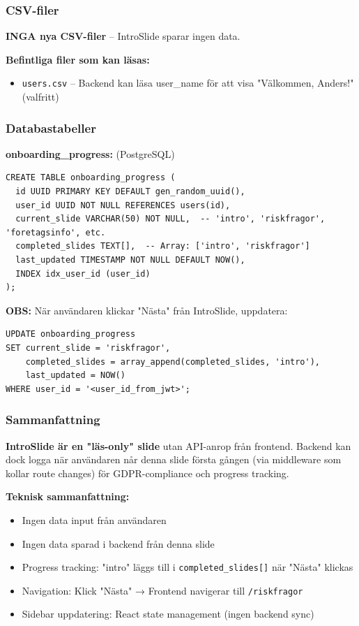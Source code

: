 \documentclass[12pt,a4paper]{article}
\begin{document}
\subsubsection{CSV-filer}
\textbf{INGA nya CSV-filer} -- IntroSlide sparar ingen data.

\textbf{Befintliga filer som kan läsas:}
\begin{itemize}[noitemsep]
  \item \texttt{users.csv} -- Backend kan läsa user\_name för att visa "Välkommen, Anders!" (valfritt)
\end{itemize}

\subsubsection{Databastabeller}
\textbf{onboarding\_progress:} (PostgreSQL)
\begin{lstlisting}
CREATE TABLE onboarding_progress (
  id UUID PRIMARY KEY DEFAULT gen_random_uuid(),
  user_id UUID NOT NULL REFERENCES users(id),
  current_slide VARCHAR(50) NOT NULL,  -- 'intro', 'riskfragor', 'foretagsinfo', etc.
  completed_slides TEXT[],  -- Array: ['intro', 'riskfragor']
  last_updated TIMESTAMP NOT NULL DEFAULT NOW(),
  INDEX idx_user_id (user_id)
);
\end{lstlisting}

\textbf{OBS:} När användaren klickar "Nästa" från IntroSlide, uppdatera:
\begin{lstlisting}
UPDATE onboarding_progress
SET current_slide = 'riskfragor',
    completed_slides = array_append(completed_slides, 'intro'),
    last_updated = NOW()
WHERE user_id = '<user_id_from_jwt>';
\end{lstlisting}

\subsubsection{Sammanfattning}
\textbf{IntroSlide är en "läs-only" slide} utan API-anrop från frontend. Backend kan dock logga när användaren når denna slide första gången (via middleware som kollar route changes) för GDPR-compliance och progress tracking.

\textbf{Teknisk sammanfattning:}
\begin{itemize}[noitemsep]
  \item Ingen data input från användaren
  \item Ingen data sparad i backend från denna slide
  \item Progress tracking: "intro" läggs till i \texttt{completed\_slides[]} när "Nästa" klickas
  \item Navigation: Klick "Nästa" → Frontend navigerar till \texttt{/riskfragor}
  \item Sidebar uppdatering: React state management (ingen backend sync)
\end{itemize}
\end{document}
